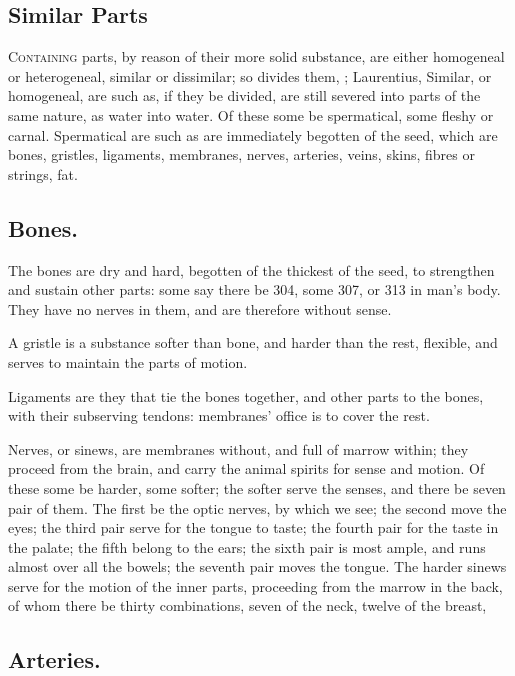 \subsection{Similar Parts}

\lettrine{C}{ontaining} parts, by reason of their more solid substance, are
either homogeneal or heterogeneal, similar or dissimilar; so \Aristotle{} divides
them, ; Laurentius,
 Similar, or homogeneal, are such as, if
they be divided, are still severed into parts of the same nature, as water into
water. Of these some be spermatical, some fleshy or carnal.
Spermatical are such as are immediately begotten of the
seed, which are bones, gristles, ligaments, membranes, nerves, arteries, veins,
skins, fibres or strings, fat.

\subsection{Bones.}

The bones are dry and hard, begotten of the thickest of the
seed, to strengthen and sustain other parts: some say there be 304, some 307,
or 313 in man's body. They have no nerves in them, and are therefore without
sense.

A gristle is a substance softer than bone, and harder than the rest, flexible,
and serves to maintain the parts of motion.

Ligaments are they that tie the bones together, and other parts to the bones,
with their subserving tendons: membranes' office is to cover the rest.

Nerves, or sinews, are membranes without, and full of marrow within; they
proceed from the brain, and carry the animal spirits for sense and motion. Of
these some be harder, some softer; the softer serve the senses, and there be
seven pair of them. The first be the optic nerves, by which we see; the second
move the eyes; the third pair serve for the tongue to taste; the fourth pair
for the taste in the palate; the fifth belong to the ears; the sixth pair is
most ample, and runs almost over all the bowels; the seventh pair moves the
tongue. The harder sinews serve for the motion of the inner parts, proceeding
from the marrow in the back, of whom there be thirty combinations, seven of the
neck, twelve of the breast, \etc{}

\subsection{Arteries.}

